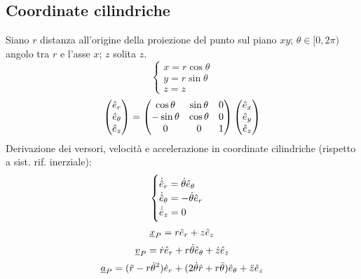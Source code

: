 \documentclass[11pt,landscape]{article}
\begin{document}
\begin{multicols}{3}
    \subsection{Coordinate cilindriche}
        Siano $r$ distanza all'origine della proiezione del punto sul piano $xy$; $\theta \in [0, 2\pi)$ angolo tra $r$ e l'asse $x$; $z$ solita $z$.
        $$ \begin{cases}
            x = r \cos \theta \\
            y = r \sin \theta \\
            z = z
        \end{cases}$$
        $$\begin{pmatrix} \hat{e}_r \\ \hat{e}_\theta \\ \hat{e}_z \end{pmatrix} = 
            \begin{pmatrix}
                \cos \theta & \sin \theta & 0 \\
                -\sin \theta & \cos \theta & 0 \\
                0 & 0 & 1
            \end{pmatrix}
        \begin{pmatrix} \hat{e}_x \\\hat{e}_y \\\hat{e}_z \end{pmatrix}$$
        Derivazione dei versori, velocità e accelerazione in coordinate cilindriche (rispetto a sist. rif. inerziale):
        $$ \begin{cases}
            \dot{\hat{e}}_r = \dot{\theta} \hat{e}_\theta\\
            \dot{\hat{e}}_\theta = -\dot{\theta} \hat{e}_r\\
            \dot{\hat{e}}_z = 0
        \end{cases}$$
        $$ \underline{x}_P = r\hat{e}_r + z\hat{e}_z$$
        $$ \underline{v}_P = \dot{r} \hat{e}_r + r \dot{\theta} \hat{e}_\theta + \dot{z}\hat{e}_z$$
        $$ \underline{a}_P = (\ddot{r} - r \dot{\theta}^2)\hat{e}_r + (2 \dot{\theta}\dot{r} + r\ddot{\theta})\hat{e}_\theta + \ddot{z} \hat{e}_z$$

\end{multicols}
\end{document}
